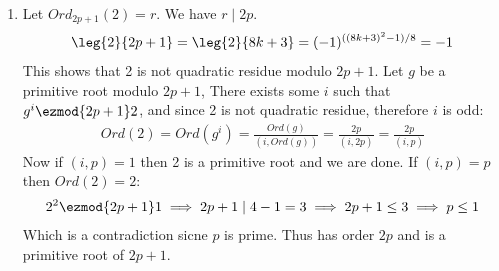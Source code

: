 \begin{enumerate}[label=]
    \item 
        Let $Ord_{2p + 1}(2) = r$. We have $r \mid 2p$.
        \begin{gather*}
            \leg{2}{2p + 1} = \leg{2}{8k + 3} = (-1)^{((8k + 3)^2 - 1)/8} = -1
        \end{gather*}
        This shows that 2 is not quadratic residue modulo $2p + 1$.
        Let $g$ be a primitive root modulo $2p + 1$, There exists some $i$ such that $g^i \ezmod{2p + 1} 2$, and since 2 is not quadratic residue, therefore $i$ is odd:
        \begin{gather*}
            Ord(2) = Ord(g^i) = \frac{Ord(g)}{(i, Ord(g))} = \frac{2p}{(i, 2p)} = \frac{2p}{(i, p)}
        \end{gather*}
        Now if $(i, p) = 1$ then 2 is a primitive root and we are done. If $(i, p) = p$ then $Ord(2) = 2$:
        \begin{gather*}
            2^2 \ezmod{2p + 1} 1 \implies 2p + 1 \mid 4 - 1 = 3 \implies 2p + 1 \le 3 \implies p \le 1
        \end{gather*}
        Which is a contradiction sicne $p$ is prime. Thus has order $2p$ and is a primitive root of $2p + 1$.
\end{enumerate}